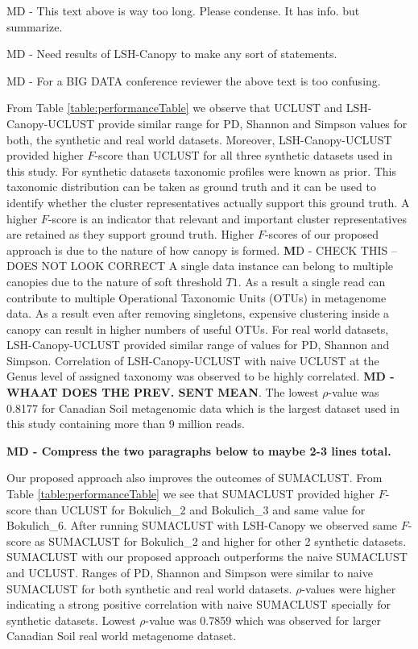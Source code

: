 \documentclass[10pt, conference, compsocconf]{IEEEtran}
\begin{document}
MD - This text above is way too long. Please condense. It has info. but summarize.

MD - Need results of LSH-Canopy to make any sort of statements. 

MD - For a BIG DATA conference reviewer the above text is too confusing.

From Table \ref{table:performanceTable} we observe 
that UCLUST and LSH-Canopy-UCLUST provide similar range for PD, Shannon and 
Simpson values for both, the synthetic 
and real world datasets. Moreover, LSH-Canopy-UCLUST provided higher $F$-score than UCLUST for all three
synthetic datasets used in this study. 
%
For synthetic datasets taxonomic profiles were known as prior. This taxonomic distribution 
can be taken as ground truth and it can be used to 
identify whether the cluster representatives actually support this 
ground truth. A higher $F$-score is an indicator that relevant and important cluster representatives are retained 
as they support ground truth. Higher $F$-scores of our proposed approach is
due to the nature of how canopy is formed. {{\textbf MD - CHECK THIS -- DOES NOT LOOK CORRECT}} A single data instance can belong 
to multiple canopies due to the nature of soft threshold $T1$. As a result 
a single read can contribute to multiple Operational Taxonomic Units (OTUs) in 
metagenome data. As a result even after removing 
singletons, expensive clustering inside a canopy can result in 
higher numbers of useful OTUs. For real world datasets, 
LSH-Canopy-UCLUST provided similar range of values for PD, Shannon and Simpson. Correlation of LSH-Canopy-UCLUST with naive 
UCLUST at the Genus level of assigned taxonomy was observed to be highly correlated. {\bf MD - WHAAT DOES THE PREV. SENT MEAN}.  The 
lowest $\rho$-value was 0.8177 for Canadian Soil metagenomic data which is the 
largest dataset used in this study containing more than
9 million reads.  

{\textbf{MD - Compress the two paragraphs below to maybe 2-3 lines total.}}

Our proposed approach also improves the outcomes of 
SUMACLUST. From Table \ref{table:performanceTable} we 
see that SUMACLUST provided higher $F$-score than UCLUST for Bokulich\_2 and Bokulich\_3 and same value for Bokulich\_6. After running 
SUMACLUST with LSH-Canopy we observed same $F$-score as SUMACLUST for Bokulich\_2 and higher for other 
2 synthetic datasets. SUMACLUST with our proposed approach outperforms the naive SUMACLUST and UCLUST. Ranges of PD, Shannon and Simpson were similar to naive SUMACLUST for both synthetic and real world datasets. $\rho$-values were higher indicating a strong positive correlation with naive SUMACLUST specially for synthetic datasets. Lowest $\rho$-value was 0.7859 which was observed for larger Canadian Soil real world metagenome dataset.
\end{document}
